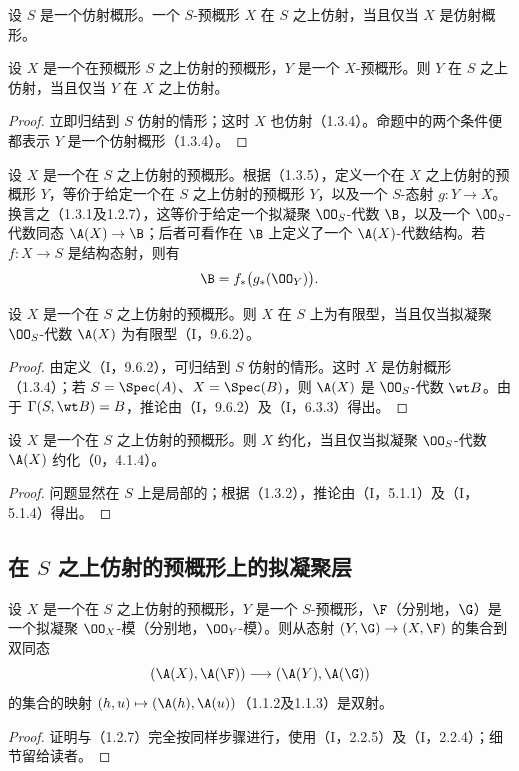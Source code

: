 设 $S$ 是一个仿射概形。一个 $S$-预概形 $X$ 在 $S$ 之上仿射，当且仅当 $X$ 是仿射概形。

设 $X$ 是一个在预概形 $S$ 之上仿射的预概形，$Y$ 是一个 $X$-预概形。则 $Y$ 在 $S$ 之上仿射，当且仅当 $Y$ 在 $X$ 之上仿射。
\begin{proof}
立即归结到 $S$ 仿射的情形；这时 $X$ 也仿射（1.3.4）。命题中的两个条件便都表示 $Y$ 是一个仿射概形（1.3.4）。
\end{proof}

设 $X$ 是一个在 $S$ 之上仿射的预概形。根据（1.3.5），定义一个在 $X$ 之上仿射的预概形 $Y$，等价于给定一个在 $S$ 之上仿射的预概形 $Y$，以及一个 $S$-态射 $g:Y\to X$。换言之（1.3.1及1.2.7），这等价于给定一个拟凝聚 $\OO_S$-代数 $\B$，以及一个 $\OO_S$-代数同态 $\A(X)\to\B$；后者可看作在 $\B$ 上定义了一个 $\A(X)$-代数结构。若 $f:X\to S$ 是结构态射，则有
\[
\B=f_*\bigl(g_*(\OO_Y)\bigr).
\]

设 $X$ 是一个在 $S$ 之上仿射的预概形。则 $X$ 在 $S$ 上为有限型，当且仅当拟凝聚 $\OO_S$-代数 $\A(X)$ 为有限型（I，9.6.2）。
\begin{proof}
由定义（I，9.6.2），可归结到 $S$ 仿射的情形。这时 $X$ 是仿射概形（1.3.4）；若 $S=\Spec(A)$、$X=\Spec(B)$，则 $\A(X)$ 是 $\OO_S$-代数 $\wt B$。由于 $\Gamma(S,\wt B)=B$，推论由（I，9.6.2）及（I，6.3.3）得出。
\end{proof}

设 $X$ 是一个在 $S$ 之上仿射的预概形。则 $X$ 约化，当且仅当拟凝聚 $\OO_S$-代数 $\A(X)$ 约化（0，4.1.4）。
\begin{proof}
问题显然在 $S$ 上是局部的；根据（1.3.2），推论由（I，5.1.1）及（I，5.1.4）得出。
\end{proof}

\subsection{在 \texorpdfstring{$S$}{S} 之上仿射的预概形上的拟凝聚层}
设 $X$ 是一个在 $S$ 之上仿射的预概形，$Y$ 是一个 $S$-预概形，$\F$（分别地，$\G$）是一个拟凝聚 $\OO_X$-模（分别地，$\OO_Y$-模）。则从态射 $(Y,\G)\to(X,\F)$ 的集合到双同态
\[
(\A(X),\A(\F))\longrightarrow(\A(Y),\A(\G))
\]
的集合的映射 $(h,u)\mapsto(\A(h),\A(u))$（1.1.2及1.1.3）是双射。
\begin{proof}
证明与（1.2.7）完全按同样步骤进行，使用（I，2.2.5）及（I，2.2.4）；细节留给读者。
\end{proof}

